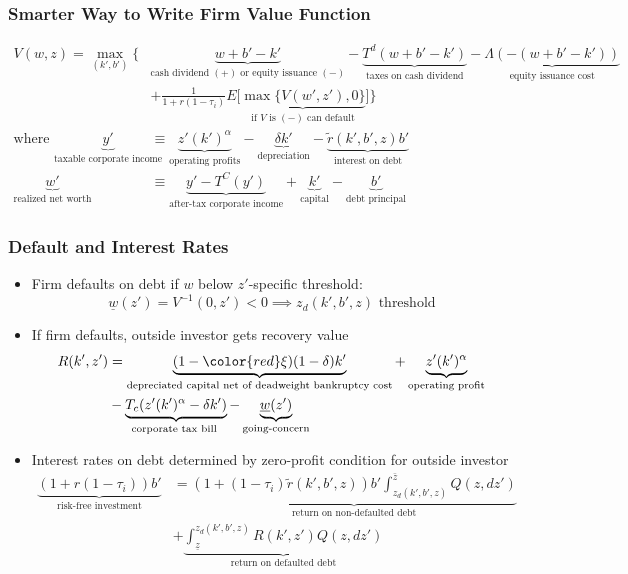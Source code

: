 \documentclass[usenames,dvipsnames, handout]{beamer}
\begin{document}
\begin{frame}
\frametitle{Smarter Way to Write Firm Value Function}
\scriptsize
\begin{align*}
V(w, z) =
\max_{(k', b')} \Bigg\{ 
& \underbrace{w + b' - k'}_{\text{cash dividend } (+) \text{ or equity issuance } (-)} - \underbrace{T^d(w + b' - k')}_{\text{taxes on cash dividend}} - \underbrace{\Lambda(-(w + b' - k'))}_{\text{equity issuance cost}} \\
&+ \frac{1}{1+r(1-\tau_i)} E\Big[\underbrace{\max\{ V(w', z'), 0\}}_{\text{if }V \text{ is } (-) \text{ can default}}\Big] \Bigg\} \\
\text{where }
\underbrace{y'}_{\text{taxable corporate income}} &\equiv \underbrace{z' (k')^\alpha}_{\text{operating profits}} - \underbrace{\delta k'}_{\text{depreciation}} - \underbrace{\tilde r(k', b', z) b'}_{\text{interest on debt}} \\
\underbrace{w'}_{\text{realized net worth}} &\equiv \underbrace{y' - T^C(y')}_{\text{after-tax corporate income}}+ \underbrace{k'}_{\text{capital}}  - \underbrace{b'}_{\text{debt principal}} \end{align*}
\end{frame}


\begin{frame}
\frametitle{Default and Interest Rates}
\small
\begin{itemize}
\item Firm defaults on debt if $w$ below $z'$-specific threshold:
$$
\underline{w}(z') = V^{-1}(0, z') < 0 \implies z_d(k', b', z) \text{ threshold}
$$
\item If firm defaults, outside investor gets recovery value
\begin{align*}
R(k', z') &= \underbrace{(1-{\color{red}\xi}) (1-\delta)k'}_{\text{depreciated capital net of deadweight bankruptcy cost}} + \underbrace{z'(k')^\alpha}_{\text{operating profit}} \\&- \underbrace{T_c(z'(k')^\alpha - \delta k')}_{\text{corporate tax bill }} - \underbrace{\underline w (z')}_{\text{going-concern}}
\end{align*}
\item Interest rates on debt determined by zero-profit condition for outside investor
\begin{align*}
\underbrace{(1+r(1-\tau_i))b'}_{\text{risk-free investment}} 
&=
\underbrace{(1+(1-\tau_i)\tilde r(k', b', z))b' \int_{z_d(k', b', z)}^{\bar z} Q(z,dz')}_{\text{return on non-defaulted debt}} \\
&+ \underbrace{\int_{\underline z}^{z_d (k', b', z)} R(k', z') Q(z, dz')}_{\text{return on defaulted debt}}
\end{align*}
\end{itemize}
\end{frame}
\end{document}
